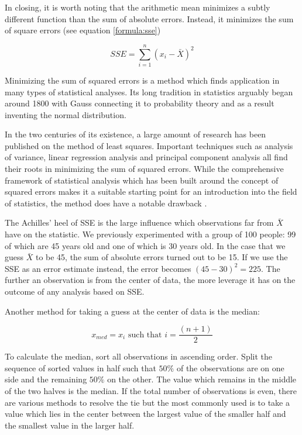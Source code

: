 \documentclass{tufte-book} %
\begin{document}
In closing, it is worth noting that the arithmetic mean minimizes a subtly different function than the sum of absolute errors. Instead, it minimizes the sum of square errors (see equation \ref{formula:sse})

\begin{equation} \label{formula:sse}
	SSE = \sum_{i=1}^n (x_i - \bar{X})^2
\end{equation}

\begin{tcolorbox}
Minimizing the sum of squared errors is a method which finds application in many types of statistical analyses. Its long tradition in statistics arguably began around 1800 with Gauss connecting it to probability theory and as a result inventing the normal distribution.
\end{tcolorbox}

In the two centuries of its existence, a large amount of research has been published on the method of least squares. Important techniques such as analysis of variance, linear regression analysis and principal component analysis all find their roots in minimizing the sum of squared errors. While the comprehensive framework of statistical analysis which has been built around the concept of squared errors makes it a suitable starting point for an introduction into the field of statistics, the method does have a notable drawback \cite{Abdi2007}.

The Achilles' heel of SSE is the large influence which observations far from $\bar{X}$ have on the statistic. We previously experimented with a group of 100 people: 99 of which are 45 years old and one of which is 30 years old. In the case that we guess $\bar{X}$ to be 45, the sum of absolute errors turned out to be 15. If we use the SSE as an error estimate instead, the error becomes $(45 - 30) ^2 = 225$. The further an observation is from the center of data, the more leverage it has on the outcome of any analysis based on SSE.

Another method for taking a guess at the center of data is the median:

\begin{equation} \label{formula:median}
	x_{med} = x_i \mbox{ such that } i = \frac{(n + 1)}{2}
\end{equation}

To calculate the median, sort all observations in ascending order. Split the sequence of sorted values in half such that $50\%$ of the observations are on one side and the remaining $50\%$ on the other. The value which remains in the middle of the two halves is the median. If the total number of observations is even, there are various methods to resolve the tie but the most commonly used is to take a value which lies in the center between the largest value of the smaller half and the smallest value in the larger half.
\end{document}
